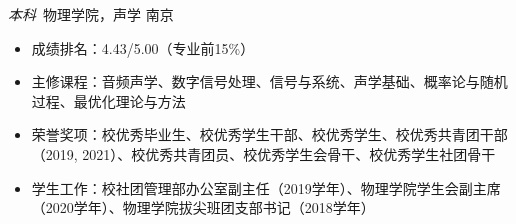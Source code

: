 \documentclass{resume}
\begin{document}
\begin{onehalfspacing}
\textit{本科}\ 物理学院，声学 \hfill 南京
\begin{itemize}
    \item 成绩排名：4.43/5.00（专业前15\%）
    \item 主修课程：音频声学、数字信号处理、信号与系统、声学基础、概率论与随机过程、最优化理论与方法
    \item 荣誉奖项：校优秀毕业生、校优秀学生干部、校优秀学生、校优秀共青团干部（2019, 2021）、校优秀共青团员、校优秀学生会骨干、校优秀学生社团骨干
    \item 学生工作：校社团管理部办公室副主任（2019学年）、物理学院学生会副主席（2020学年）、物理学院拔尖班团支部书记（2018学年）
\end{itemize}
\end{onehalfspacing}
\end{document}
